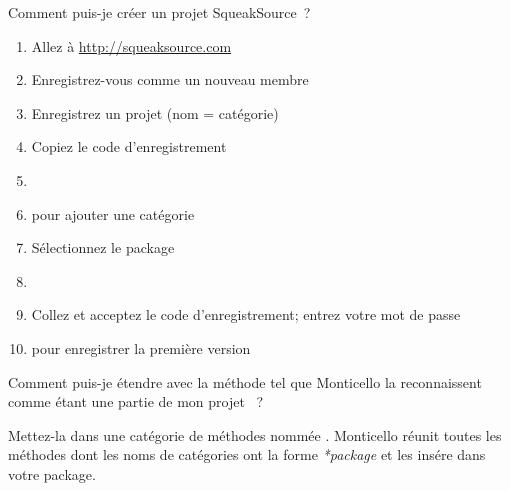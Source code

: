\documentclass[a4paper,10pt,twoside]{book}
\begin{document}
\begin{faq}
Comment puis-je créer un projet SqueakSource~?
\end{faq}
\answer
\begin{enumerate}
  \item Allez à \url{http://squeaksource.com}
  \item Enregistrez-vous comme un nouveau membre
  \item Enregistrez un projet (nom = catégorie)
  \item Copiez le code d'enregistrement
  \item {}
  \item {} pour ajouter une catégorie
  \item Sélectionnez le package
  \item {}
  \item Collez et acceptez le code d'enregistrement; entrez votre mot de passe
  \item {} pour enregistrer la première version
\end{enumerate}

\begin{faq}
Comment puis-je étendre  avec
la méthode  
tel que Monticello la reconnaissent comme étant une partie de mon projet ~?
\end{faq}
\answer
Mettez-la 
dans une catégorie de méthodes nommée .
Monticello réunit toutes les méthodes 
dont les noms de catégories 
ont la forme \emph{*package} et les insére dans votre package.
\end{document}
